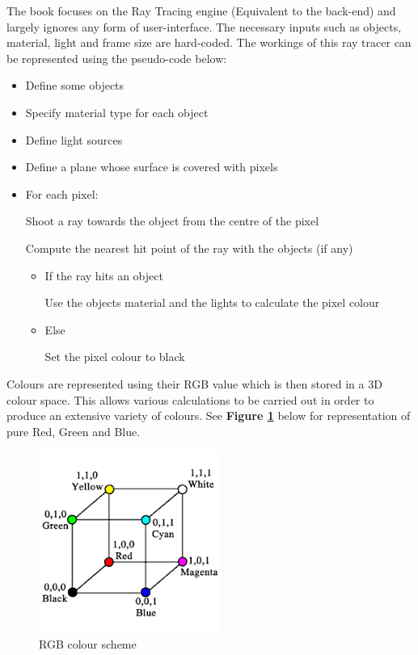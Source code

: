 \documentclass[a4paper]{article}
\begin{document}
	\par The book focuses on the Ray Tracing engine (Equivalent to the back-end) and largely ignores any form of user-interface. The necessary inputs such as objects, material, light and frame size are hard-coded. The workings of this ray tracer can be represented using the pseudo-code below:\\
	\begin{itemize}
		\item Define some objects
		\item Specify material type for each object
		\item Define light sources
		\item Define a plane whose surface is covered with pixels
		\item  For each pixel:
		\par   Shoot a ray towards the object from the centre of the pixel
		\par Compute the nearest hit point of the ray with the objects (if any)
		\begin{itemize}
			\item If the ray hits an object
			\par Use the objects material and the lights to calculate the pixel colour
			\item Else
			\par Set the pixel colour to black
			
		\end{itemize}
	\end{itemize}
	
	\par Colours are represented using their RGB value which is then stored in a 3D colour space. This allows various calculations to be carried out in order to produce an extensive variety of colours. See \textbf{Figure \ref{fig:colour}} below for representation of pure Red, Green and Blue.
	
	\begin{figure}[ht!]
		\centering
		\includegraphics[scale=0.60]{./colour.png}
		\caption{RGB colour scheme}
		\label{fig:colour}
	\end{figure}
	
\end{document}
